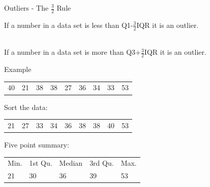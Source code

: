 \begin{frame}{Outliers - The $\frac{3}{2}$ Rule}

  \begin{definition}[Outliers]

    If a number in a data set is less than Q1-$\frac{3}{2}$IQR it is
    an outlier.

    ~ \\

    If a number in a data set is more than Q3+$\frac{3}{2}$IQR it is
    an outlier.

  \end{definition}
  
\end{frame}

\begin{frame}{Example}

  \begin{tabular}{lllllllll}
    40 & 21 & 38 & 38 & 27 & 36 & 34 & 33 & 53 
  \end{tabular}

  {
    Sort the data: \\
    \begin{tabular}{lllllllll}
      21 & 27 & 33 & 34 & 36 & 38 & 38 & 40 & 53
    \end{tabular}

    \vfill

    Five point summary: \\
    \begin{tabular}{lllll}
      Min. & 1st Qu. & Median    & 3rd Qu. &   Max. \\
      21   & 30      & 36        & 39     & 53
    \end{tabular}

    \vfill
    



  }
  
\end{frame}

